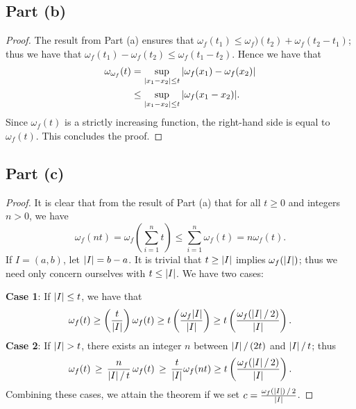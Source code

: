 \documentclass[11pt]{article}
\begin{document}

\subsection{Part (b)}

\begin{proof}
  The result from Part (a) ensures that $\omega_{f}(t_{1}) \le \omega_{f})(t_{2}) + \omega_{f}(t_{2} - t_{1})$; thus we have that $\omega_{f}(t_{1}) - \omega_{f}(t_{2}) \le \omega_{f}(t_{1} - t_{2})$. Hence we have that
  \begin{align*}
    \omega_{\omega_{f}}(t) & = \sup\limits_{\abs{x_{1} - x_{2}} \le t} \abs{\omega_{f}(x_{1}) - \omega_{f}(x_{2})} \\
                           & \le \sup\limits_{\abs{x_{1} - x_{2}} \le t} \abs{\omega_{f}(x_{1} - x_{2})}.
  \end{align*}
  Since $\omega_{f}(t)$ is a strictly increasing function, the right-hand side is equal to $\omega_{f}(t)$. This concludes the proof.
\end{proof}



\subsection{Part (c)}

\begin{proof}
  It is clear that from the result of Part (a) that for all $t \ge 0$ and integers $n > 0$, we have
  \[
    \omega_{f}(nt) = \omega_{f} \left( \sum\limits_{i = 1}^{n} t \right) \le \sum\limits_{i = 1}^{n} \omega_{f}(t) = n \omega_{f}(t).
  \]
  If $I = (a, b)$, let $\abs{I} = b - a$. It is trivial that $t \ge \abs{I}$ implies $\omega_{f}(\abs{I})$; thus we need only concern ourselves with $t \le \abs{I}$. We have two cases:
  
  \textbf{Case 1}: If $\abs{I} \le t$, we have that
  \[
    \omega_{f}(t) \ge \left( \frac{t}{\abs{I}} \right) \omega_{f}(t) \ge t \left( \frac{\omega_{f}\abs{I}}{\abs{I}} \right) \ge t \left( \frac{\omega_{f}(\abs{I} \, / \, 2)}{\abs{I}} \right).
  \]
  \textbf{Case 2}: If $\abs{I} > t$, there exists an integer $n$ between $\abs{I} \, / \, (2t)$ and $\abs{I} \, / \, t$; thus
  \[
    \omega_{f}(t) \, \ge \, \frac{n}{\abs{I} \, / \, t} \, \omega_{f}(t) \, \ge \, \frac{t}{\abs{I}} \omega_{f}(nt) \ge t \left( \frac{\omega_{f}(\abs{I} \, / \, 2)}{\abs{I}} \right).
  \]
  Combining these cases, we attain the theorem if we set $c = \tfrac{\omega_{f}(\abs{I}) \, / \, 2}{\abs{I}}$.
\end{proof}
\end{document}
